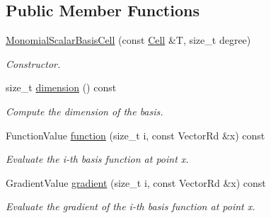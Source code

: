 \subsection*{Public Member Functions}
\begin{DoxyCompactItemize}
\item 
\hyperlink{classHArDCore3D_1_1MonomialScalarBasisCell_a88e7776e18ccc8e6dff40f2c0644246a}{Monomial\+Scalar\+Basis\+Cell} (const \hyperlink{classHArDCore3D_1_1Cell}{Cell} \&T, size\+\_\+t degree)
\begin{DoxyCompactList}\small\item\em Constructor. \end{DoxyCompactList}\item 
\mbox{\label{classHArDCore3D_1_1MonomialScalarBasisCell_aa889b63f16b51979a2fcea3253851c89}} 
size\+\_\+t \hyperlink{classHArDCore3D_1_1MonomialScalarBasisCell_aa889b63f16b51979a2fcea3253851c89}{dimension} () const
\begin{DoxyCompactList}\small\item\em Compute the dimension of the basis. \end{DoxyCompactList}\item 
\mbox{\label{classHArDCore3D_1_1MonomialScalarBasisCell_aed6372e890152e660a20b73b6949fa28}} 
Function\+Value \hyperlink{classHArDCore3D_1_1MonomialScalarBasisCell_aed6372e890152e660a20b73b6949fa28}{function} (size\+\_\+t i, const Vector\+Rd \&x) const
\begin{DoxyCompactList}\small\item\em Evaluate the i-\/th basis function at point x. \end{DoxyCompactList}\item 
\mbox{\label{classHArDCore3D_1_1MonomialScalarBasisCell_afe6fb4aef0d61e720116d8ba64c94971}} 
Gradient\+Value \hyperlink{classHArDCore3D_1_1MonomialScalarBasisCell_afe6fb4aef0d61e720116d8ba64c94971}{gradient} (size\+\_\+t i, const Vector\+Rd \&x) const
\begin{DoxyCompactList}\small\item\em Evaluate the gradient of the i-\/th basis function at point x. \end{DoxyCompactList}\end{DoxyCompactItemize}
